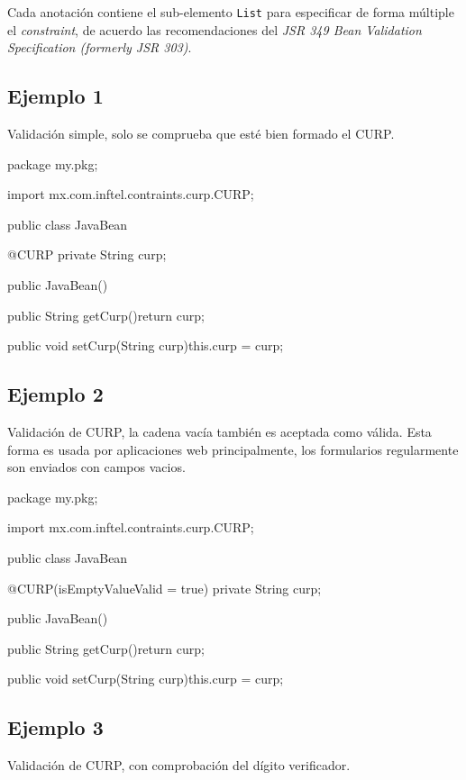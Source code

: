 \documentclass[12pt,letterpaper]{article}
\begin{document}
Cada anotación contiene el sub-elemento \texttt{List} para especificar de forma múltiple el \emph{constraint}, de
acuerdo las recomendaciones del \emph{JSR 349 Bean Validation Specification (formerly JSR 303)}.

\subsection{Ejemplo 1}

Validación simple, solo se comprueba que esté bien formado el CURP.

\begin{listing}{1}
package my.pkg;

import mx.com.inftel.contraints.curp.CURP;

public class JavaBean{

    @CURP
    private String curp;

    public JavaBean(){}

    public String getCurp(){return curp;}

    public void setCurp(String curp){this.curp = curp;}
}
\end{listing}

\subsection{Ejemplo 2}

Validación de CURP, la cadena vacía también es aceptada como válida. Esta forma es usada por aplicaciones
web principalmente, los formularios regularmente son enviados con campos vacios.

\begin{listing}{1}
package my.pkg;

import mx.com.inftel.contraints.curp.CURP;

public class JavaBean{

    @CURP(isEmptyValueValid = true)
    private String curp;

    public JavaBean(){}

    public String getCurp(){return curp;}

    public void setCurp(String curp){this.curp = curp;}
}
\end{listing}

\subsection{Ejemplo 3}

Validación de CURP, con comprobación del dígito verificador.
\end{document}
